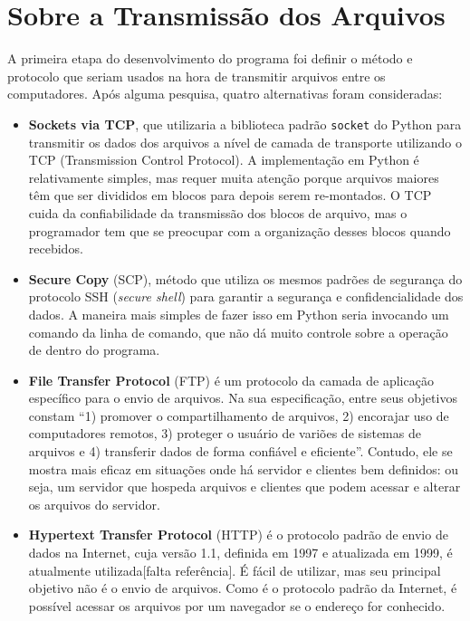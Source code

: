 \documentclass[12pt,a4paper]{ufpr}
\begin{document}
\section{Sobre a Transmissão dos Arquivos}
A primeira etapa do desenvolvimento do programa foi definir o método e protocolo que seriam usados na hora de transmitir arquivos entre os computadores.
Após alguma pesquisa, quatro alternativas foram consideradas: 
\begin{itemize}
  \item \textbf{Sockets via TCP}, que utilizaria a biblioteca padrão \texttt{socket} do Python\cite{pythonsockets} para transmitir os dados dos arquivos a nível de camada de transporte utilizando o TCP (Transmission Control Protocol). A implementação em Python é relativamente simples, mas requer muita atenção porque arquivos maiores têm que ser divididos em blocos para depois serem re-montados. O TCP cuida da confiabilidade da transmissão dos blocos de arquivo\cite{cerf2005protocol}, mas o programador tem que se preocupar com a organização desses blocos quando recebidos.
  \item \textbf{Secure Copy} (SCP), método que utiliza os mesmos padrões de segurança do protocolo SSH (\textit{secure shell}) para garantir a segurança e confidencialidade dos dados\cite{scpcommand}. A maneira mais simples de fazer isso em Python seria invocando um comando da linha de comando, que não dá muito controle sobre a operação de dentro do programa.
  \item \textbf{File Transfer Protocol} (FTP) é um protocolo da camada de aplicação específico para o envio de arquivos. Na sua especificação, entre seus objetivos constam ``1) promover o compartilhamento de arquivos, 2) encorajar uso de computadores remotos, 3) proteger o usuário de variões de sistemas de arquivos e 4) transferir dados de forma confiável e eficiente''\cite{rfc959}. Contudo, ele se mostra mais eficaz em situações onde há servidor e clientes bem definidos: ou seja, um servidor que hospeda arquivos e clientes que podem acessar e alterar os arquivos do servidor.
  \item \textbf{Hypertext Transfer Protocol} (HTTP) é o protocolo padrão de envio de dados na Internet, cuja versão 1.1, definida em 1997 e atualizada em 1999\cite{rfc2616}, é atualmente utilizada[falta referência]. É fácil de utilizar, mas seu principal objetivo não é o envio de arquivos. Como é o protocolo padrão da Internet, é possível acessar os arquivos por um navegador se o endereço for conhecido.
\end{itemize}
\end{document}
